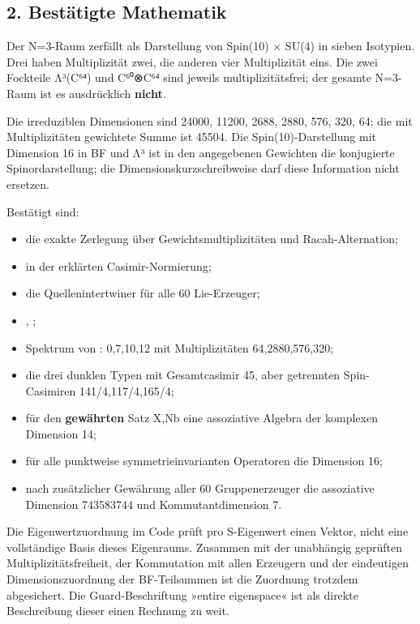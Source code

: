 \subsection{2. Bestätigte Mathematik}\label{bestuxe4tigte-mathematik}

Der N=3-Raum zerfällt als Darstellung von Spin(10) × SU(4) in sieben
Isotypien. Drei haben Multiplizität zwei, die anderen vier Multiplizität
eins. Die zwei Fockteile Λ³(C⁶⁴) und C⁶⁰⊗C⁶⁴ sind jeweils
multiplizitätsfrei; der gesamte N=3-Raum ist es ausdrücklich
\textbf{nicht}.

Die irreduziblen Dimensionen sind 24000, 11200, 2688, 2880, 576, 320,
64; die mit Multiplizitäten gewichtete Summe ist 45504. Die
Spin(10)-Darstellung mit Dimension 16 in BF und Λ³ ist in den
angegebenen Gewichten die konjugierte Spinordarstellung; die
Dimensionskurzschreibweise  darf diese Information nicht
ersetzen.

Bestätigt sind:

\begin{itemize}
\tightlist
\item
  die exakte Zerlegung über Gewichtsmultiplizitäten und
  Racah-Alternation;
\item
   in der erklärten Casimir-Normierung;
\item
  die Quellenintertwiner für alle 60 Lie-Erzeuger;
\item
  , ;
\item
  Spektrum von : 0,7,10,12 mit Multiplizitäten
  64,2880,576,320;
\item
  die drei dunklen Typen mit Gesamtcasimir 45, aber getrennten
  Spin-Casimiren 141/4,117/4,165/4;
\item
  für den \textbf{gewährten} Satz X,Nb eine assoziative Algebra der
  komplexen Dimension 14;
\item
  für alle punktweise symmetrieinvarianten Operatoren die Dimension 16;
\item
  nach zusätzlicher Gewährung aller 60 Gruppenerzeuger die assoziative
  Dimension 743583744 und Kommutantdimension 7.
\end{itemize}

Die Eigenwertzuordnung im Code prüft pro S-Eigenwert einen Vektor, nicht
eine vollständige Basis dieses Eigenraums. Zusammen mit der unabhängig
geprüften Multiplizitätsfreiheit, der Kommutation mit allen Erzeugern
und der eindeutigen Dimensionszuordnung der BF-Teilsummen ist die
Zuordnung trotzdem abgesichert. Die Guard-Beschriftung »entire
eigenspace« ist als direkte Beschreibung dieser einen Rechnung zu weit.

